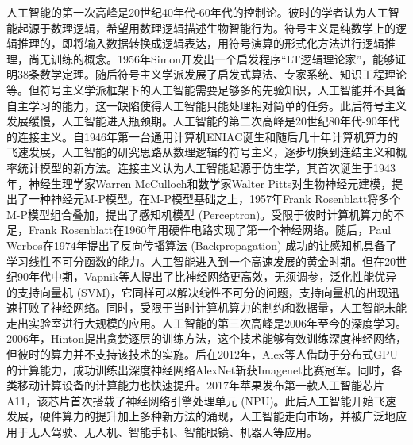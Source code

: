 人工智能的第一次高峰是20世纪40年代-60年代的控制论。彼时的学者认为人工智能起源于数理逻辑，希望用数理逻辑描述生物智能行为。符号主义是纯数学上的逻辑推理的，即将输入数据转换成逻辑表达，用符号演算的形式化方法进行逻辑推理，尚无训练的概念。1956年Simon开发出一个启发程序“LT逻辑理论家”，能够证明38条数学定理。随后符号主义学派发展了启发式算法、专家系统、知识工程理论等。但符号主义学派框架下的人工智能需要足够多的先验知识，人工智能并不具备自主学习的能力，这一缺陷使得人工智能只能处理相对简单的任务。此后符号主义发展缓慢，人工智能进入瓶颈期。人工智能的第二次高峰是20世纪80年代-90年代的连接主义。自1946年第一台通用计算机ENIAC诞生和随后几十年计算机算力的飞速发展，人工智能的研究思路从数理逻辑的符号主义，逐步切换到连结主义和概率统计模型的新方法。连接主义认为人工智能起源于仿生学，其首次诞生于1943年，神经生理学家Warren McCulloch和数学家Walter Pitts对生物神经元建模，提出了一种神经元M-P模型。在M-P模型基础之上，1957年Frank Rosenblatt将多个M-P模型组合叠加，提出了感知机模型 (Perceptron)。受限于彼时计算机算力的不足，Frank Rosenblatt在1960年用硬件电路实现了第一个神经网络。随后，Paul Werbos在1974年提出了反向传播算法 (Backpropagation) 成功的让感知机具备了学习线性不可分函数的能力。人工智能进入到一个高速发展的黄金时期。但在20世纪90年代中期，Vapnik等人提出了比神经网络更高效，无须调参，泛化性能优异的支持向量机 (SVM)，它同样可以解决线性不可分的问题，支持向量机的出现迅速打败了神经网络。同时，受限于当时计算机算力的制约和数据量，人工智能未能走出实验室进行大规模的应用。人工智能的第三次高峰是2006年至今的深度学习。2006年，Hinton提出贪婪逐层的训练方法，这个技术能够有效训练深度神经网络，但彼时的算力并不支持该技术的实施。后在2012年，Alex等人借助于分布式GPU的计算能力，成功训练出深度神经网络AlexNet斩获Imagenet比赛冠军。同时，各类移动计算设备的计算能力也快速提升。2017年苹果发布第一款人工智能芯片A11，该芯片首次搭载了神经网络引擎处理单元 (NPU)。此后人工智能开始飞速发展，硬件算力的提升加上多种新方法的涌现，人工智能走向市场，并被广泛地应用于无人驾驶、无人机、智能手机、智能眼镜、机器人等应用。


